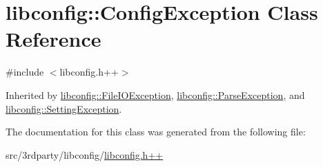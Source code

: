 \hypertarget{classlibconfig_1_1_config_exception}{
\section{libconfig::ConfigException Class Reference}
\label{classlibconfig_1_1_config_exception}
}


{\ttfamily \#include $<$libconfig.h++$>$}



Inherited by \hyperlink{classlibconfig_1_1_file_i_o_exception}{libconfig::FileIOException}, \hyperlink{classlibconfig_1_1_parse_exception}{libconfig::ParseException}, and \hyperlink{classlibconfig_1_1_setting_exception}{libconfig::SettingException}.



The documentation for this class was generated from the following file:\begin{DoxyCompactItemize}
\item 
src/3rdparty/libconfig/\hyperlink{libconfig_8h_09_09}{libconfig.h++}\end{DoxyCompactItemize}
